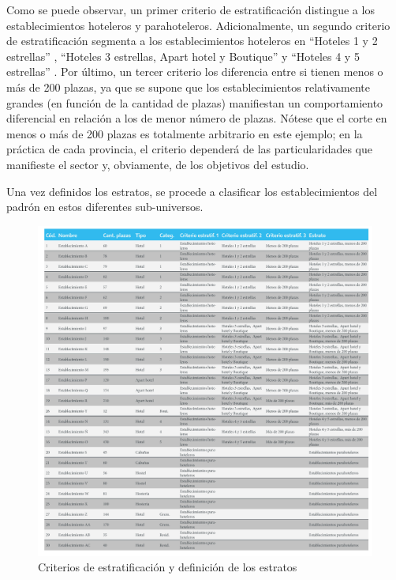\documentclass[
]{book}
\begin{document}
Como se puede observar, un primer criterio de estratificación distingue a los establecimientos hoteleros y parahoteleros. Adicionalmente, un segundo criterio de estratificación segmenta a los establecimientos hoteleros en ``Hoteles 1 y 2 estrellas'' , ``Hoteles 3 estrellas, Apart hotel y Boutique'' y ``Hoteles 4 y 5 estrellas'' . Por último, un tercer criterio los diferencia entre si tienen menos o más de 200 plazas, ya que se supone que los establecimientos relativamente grandes (en función de la cantidad de plazas) manifiestan un comportamiento diferencial en relación a los de menor número de plazas. Nótese que el corte en menos o más de 200 plazas es totalmente arbitrario en este ejemplo; en la práctica de cada provincia, el criterio dependerá de las particularidades que manifieste el sector y, obviamente, de los objetivos del estudio.

Una vez definidos los estratos, se procede a clasificar los establecimientos del padrón en estos diferentes sub-universos.

\begin{figure}

{\centering \includegraphics[width=1\linewidth]{imagenes/tabla_2} 

}

\caption{ Criterios de estratificación y definición de los estratos}\label{fig:criterios-estratos}
\end{figure}
\end{document}
